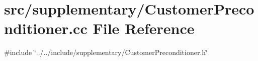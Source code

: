 \section{src/supplementary/\+Customer\+Preconditioner.cc File Reference}
\label{_customer_preconditioner_8cc}
{\ttfamily \#include \char`\"{}../../include/supplementary/\+Customer\+Preconditioner.\+h\char`\"{}}\newline
